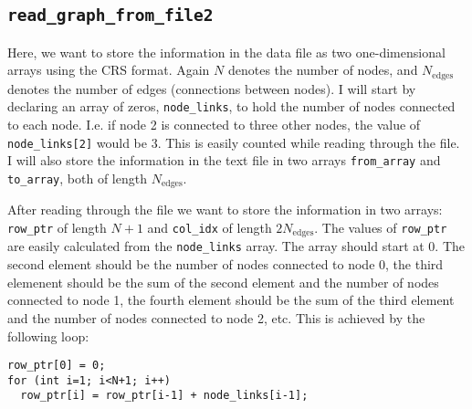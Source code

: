 \documentclass[reprint, english,notitlepage,nofootinbib]{revtex4-1}  %
\begin{document}
\subsection{\texttt{read\_graph\_from\_file2}} \label{sect:read2}

Here, we want to store the information in the data file as two one-dimensional arrays using the CRS format. Again \(N\) denotes the number of nodes, and \(N_{\text{edges}}\) denotes the number of edges (connections between nodes). I will start by declaring an array of zeros, \verb|node_links|, to hold the number of nodes connected to each node. I.e. if node 2 is connected to three other nodes, the value of \verb|node_links[2]| would be 3. This is easily counted while reading through the file. I will also store the information in the text file in two arrays \verb|from_array| and \verb|to_array|, both of length \(N_{\text{edges}}\).

After reading through the file we want to store the information in two arrays: \verb|row_ptr| of length \(N+1\) and \verb|col_idx| of length \(2 N_{\text{edges}}\). The values of \verb|row_ptr| are easily calculated from the \verb|node_links| array. The array should start at 0. The second element should be the number of nodes connected to node 0, the third elemenent should be the sum of the second element and the number of nodes connected to node 1, the fourth element should be the sum of the third element and the number of nodes connected to node 2, etc. This is achieved by the following loop:
\begin{verbatim}
row_ptr[0] = 0;
for (int i=1; i<N+1; i++)
  row_ptr[i] = row_ptr[i-1] + node_links[i-1];
\end{verbatim}
\end{document}
